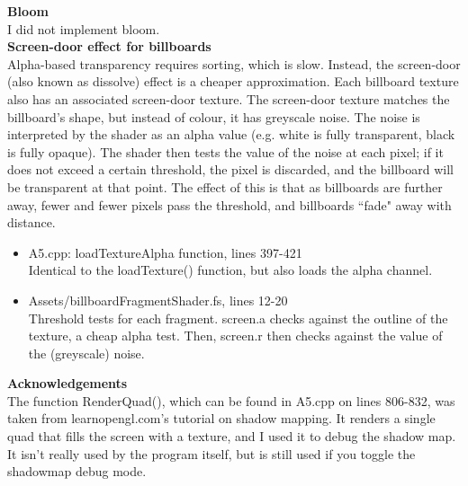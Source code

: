 \documentclass{article}
\begin{document}
	\large\noindent\textbf{Bloom}
	\normalsize
	\\

	I did not implement bloom.
	\\

	\large\noindent\textbf{Screen-door effect for billboards}
	\normalsize
	\\

	Alpha-based transparency requires sorting, which is slow. Instead, the screen-door (also known as dissolve) effect is a cheaper approximation. Each billboard texture also has an associated screen-door texture. The screen-door texture matches the billboard's shape, but instead of colour, it has greyscale noise. The noise is interpreted by the shader as an alpha value (e.g. white is fully transparent, black is fully opaque). The shader then tests the value of the noise at each pixel; if it does not exceed a certain threshold, the pixel is discarded, and the billboard will be transparent at that point. The effect of this is that as billboards are further away, fewer and fewer pixels pass the threshold, and billboards ``fade" away with distance.
	\\

	\begin{itemize}
	\item A5.cpp: loadTextureAlpha function, lines 397-421 \\
	Identical to the loadTexture() function, but also loads the alpha channel.
	\item Assets/billboardFragmentShader.fs, lines 12-20 \\
	Threshold tests for each fragment. screen.a checks against the outline of the texture, a cheap alpha test. Then, screen.r then checks against the value of the (greyscale) noise.
	\end{itemize}


\newpage

\large\noindent\textbf{Acknowledgements}
\normalsize
\\

The function RenderQuad(), which can be found in A5.cpp on lines 806-832, was taken from learnopengl.com's tutorial on shadow mapping. It renders a single quad that fills the screen with a texture, and I used it to debug the shadow map. It isn't really used by the program itself, but is still used if you toggle the shadowmap debug mode.
\\
\end{document}
